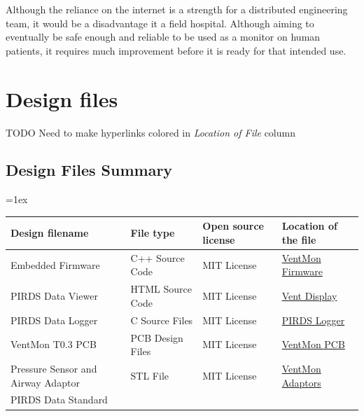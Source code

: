 \documentclass[11pt, letterpaper]{article}
\begin{document}
Although the reliance on the internet is a strength for a distributed engineering team, it would be a disadvantage it a field hospital. Although aiming to eventually be safe enough and reliable to be used as a monitor on human patients, it requires much improvement before it is ready for that intended use.

\section{Design files}

TODO Need to make hyperlinks colored in \textit{Location of File} column

\subsection{Design Files Summary}

\tabulinesep=1ex
\begin{tabu} to \linewidth {|X|X|X[1.5,1]|X[1.5,1]|}
\hline
\textbf{Design filename} & \textbf{File type} & \textbf{Open source license} & \textbf{Location of the file} \\\hline
Embedded Firmware & C++ Source Code & MIT License &  \href{https://github.com/PubInv/ventmon-ventilator-inline-test-monitor/tree/master/VentMonFirmware}{VentMon Firmware}\\\hline
PIRDS Data Viewer & HTML Source Code &  MIT License &  \href{https://github.com/PubInv/vent-display}{Vent Display} \\\hline
PIRDS Data Logger & C Source Files & MIT License & \href{https://github.com/PubInv/PIRDS-logger}{PIRDS Logger} \\\hline
VentMon T0.3 PCB & PCB Design Files & MIT License & \href{https://github.com/PubInv/ventmon-ventilator-inline-test-monitor/tree/master/design/pcb}{VentMon PCB} \\\hline
Pressure Sensor and Airway Adaptor & STL File & MIT License &  \href{https://github.com/PubInv/ventmon-ventilator-inline-test-monitor/tree/master/design/3dparts}{VentMon Adaptors}\\\hline
PIRDS Data Standard & \\\hline


\end{tabu}
\end{document}
